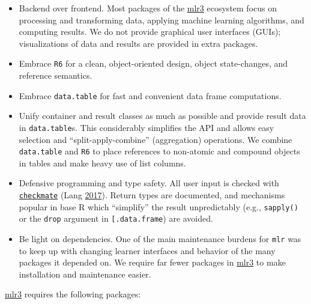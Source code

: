 \documentclass[
  11pt,
  parskip=half,
  DIV=calc,
  BCOR=10mm,
  x11names]{scrbook}
\providecommand{\tightlist}{%
  \setlength{\itemsep}{0pt}\setlength{\parskip}{0pt}}
\begin{document}
\begin{itemize}
\tightlist
\item
  Backend over frontend.
  Most packages of the \href{https://mlr3.mlr-org.com}{mlr3} ecosystem focus on processing and transforming data, applying machine learning algorithms, and computing results.
  We do not provide graphical user interfaces (GUIs); visualizations of data and results are provided in extra packages.
\item
  Embrace \texttt{R6} for a clean, object-oriented design, object state-changes, and reference semantics.
\item
  Embrace \texttt{data.table} for fast and convenient data frame computations.
\item
  Unify container and result classes as much as possible and provide result data in \texttt{data.table}s.
  This considerably simplifies the API and allows easy selection and ``split-apply-combine'' (aggregation) operations.
  We combine \texttt{data.table} and \texttt{R6} to place references to non-atomic and compound objects in tables and make heavy use of list columns.
\item
  Defensive programming and type safety.
  All user input is checked with \href{https://cran.r-project.org/package=checkmate}{\texttt{checkmate}} (Lang \protect\hyperlink{ref-checkmate}{2017}).
  Return types are documented, and mechanisms popular in base R which ``simplify'' the result unpredictably (e.g., \texttt{sapply()} or the \texttt{drop} argument in \texttt{{[}.data.frame}) are avoided.
\item
  Be light on dependencies.
  One of the main maintenance burdens for \texttt{mlr} was to keep up with changing learner interfaces and behavior of the many packages it depended on.
  We require far fewer packages in \href{https://mlr3.mlr-org.com}{mlr3} to make installation and maintenance easier.
\end{itemize}

\href{https://mlr3.mlr-org.com}{mlr3} requires the following packages:
\end{document}
